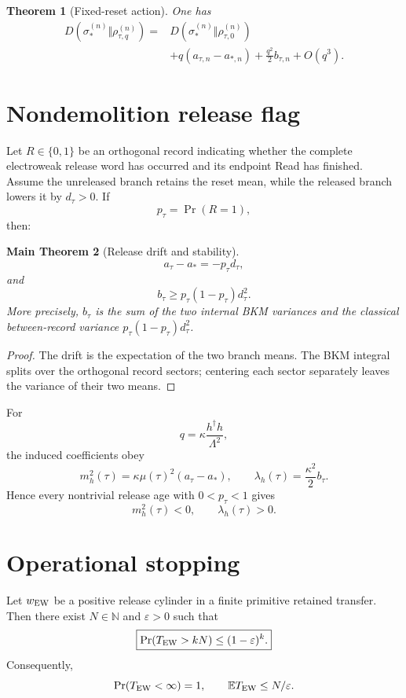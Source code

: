 \documentclass[11pt,oneside,openany]{book}
\numberwithin{equation}{chapter}
\newtheorem{theorem}{Theorem}[chapter]
\newtheorem{maintheorem}[theorem]{Main Theorem}
\theoremstyle{definition}
\theoremstyle{remark}
\newcommand{\N}{\mathbb N}
\begin{document}
\begin{theorem}[Fixed-reset action]
\label{thm:fixed-reset-action}
One has
\[
 \boxed{
 \begin{aligned}
 D(\sigma_*^{(n)}\Vert\rho_{\tau,q}^{(n)})
 ={}&
 D(\sigma_*^{(n)}\Vert\rho_{\tau,0}^{(n)})\\
 &+
 q(a_{\tau,n}-a_{*,n})
 +
 \frac{q^2}{2}b_{\tau,n}
 +
 O(q^3).
 \end{aligned}}
\]
\end{theorem}

\section{Nondemolition release flag}

Let \(R\in\{0,1\}\) be an orthogonal record indicating whether the complete
electroweak release word has occurred and its endpoint Read has finished.
Assume the unreleased branch retains the reset mean, while the released
branch lowers it by \(d_\tau>0\).  If
\[
 p_\tau=\Pr(R=1),
\]
then:

\begin{maintheorem}[Release drift and stability]
\label{thm:release-drift-BKM}
\[
 \boxed{
 a_\tau-a_*=-p_\tau d_\tau,}
\]
and
\[
 \boxed{
 b_\tau
 \ge
 p_\tau(1-p_\tau)d_\tau^2.}
\]
More precisely, \(b_\tau\) is the sum of the two internal BKM variances and
the classical between-record variance
\(p_\tau(1-p_\tau)d_\tau^2\).
\end{maintheorem}

\begin{proof}
The drift is the expectation of the two branch means.  The BKM integral
splits over the orthogonal record sectors; centering each sector separately
leaves the variance of their two means.
\end{proof}

For
\[
 q=\kappa\frac{h^\dagger h}{\Lambda^2},
\]
the induced coefficients obey
\[
 m_h^2(\tau)
 =
 \kappa\mu(\tau)^2(a_\tau-a_*),
 \qquad
 \lambda_h(\tau)
 =
 \frac{\kappa^2}{2}b_\tau.
\]
Hence every nontrivial release age with \(0<p_\tau<1\) gives
\[
 \boxed{
 m_h^2(\tau)<0,
 \qquad
 \lambda_h(\tau)>0.}
\]

\section{Operational stopping}

Let \(w_{\rm EW}\) be a positive release cylinder in a finite primitive
retained transfer.  Then there exist \(N\in\N\) and \(\varepsilon>0\) such
that
\[
 \boxed{
 \Pr(T_{\rm EW}>kN)
 \le
 (1-\varepsilon)^k.}
\]
Consequently,
\[
 \Pr(T_{\rm EW}<\infty)=1,
 \qquad
 \mathbb ET_{\rm EW}\le N/\varepsilon.
\]
\end{document}
